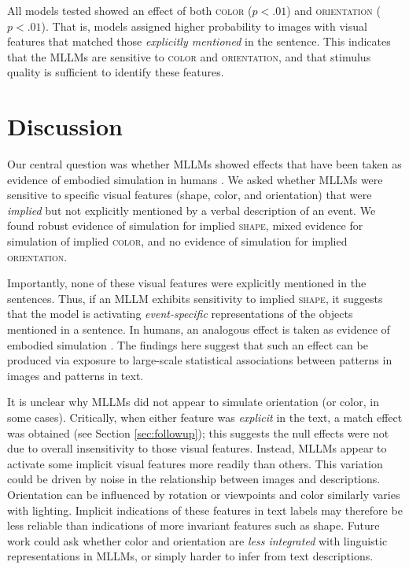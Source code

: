 \documentclass[10pt, a4paper]{article}
\begin{document}
All models tested showed an effect of both \textsc{color} ($p < .01$) and \textsc{orientation} ($p < .01$). That is, models assigned higher probability to images with visual features that matched those \textit{explicitly mentioned} in the sentence. This indicates that the MLLMs are sensitive to \textsc{color} and \textsc{orientation}, and that stimulus quality is sufficient to identify these features.

\section{Discussion}

Our central question was whether MLLMs showed effects that have been taken as evidence of embodied simulation in humans \cite{stanfield2001effect}. We asked whether MLLMs were sensitive to specific visual features (shape, color, and orientation) that were \textit{implied} but not explicitly mentioned by a verbal description of an event. We found robust evidence of simulation for implied \textsc{shape}, mixed evidence for simulation of implied \textsc{color}, and no evidence of simulation for implied \textsc{orientation}.
 
Importantly, none of these visual features were explicitly mentioned in the sentences. Thus, if an MLLM exhibits sensitivity to implied \textsc{shape}, it suggests that the model is activating \textit{event-specific} representations of the objects mentioned in a sentence. In humans, an analogous effect is taken as evidence of embodied simulation \cite{stanfield2001effect, bergen2015embodiment}. The findings here suggest that such an effect can be produced via exposure to large-scale statistical associations between patterns in images and patterns in text.

It is unclear why MLLMs did not appear to simulate orientation (or color, in some cases). Critically, when either feature was \textit{explicit} in the text, a match effect was obtained (see Section \ref{sec:followup}); this suggests the null effects were not due to overall insensitivity to those visual features. Instead, MLLMs appear to activate some implicit visual features more readily than others.
This variation could be driven by noise in the relationship between images and descriptions. Orientation can be influenced by rotation or viewpoints and color similarly varies with lighting.
Implicit indications of these features in text labels may therefore be less reliable than indications of more invariant features such as shape.
Future work could ask whether color and orientation are \textit{less integrated} with linguistic representations in MLLMs, or simply harder to infer from text descriptions.
\end{document}
